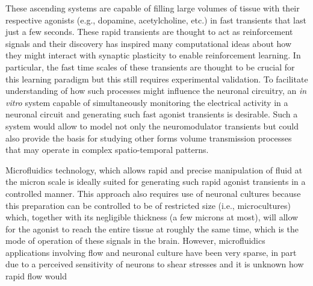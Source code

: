 These ascending systems are capable of filling large volumes of tissue with their respective agonists (e.g., dopamine, acetylcholine, etc.) in fast transients that last just a few seconds. These rapid transients are thought to act as reinforcement signals and their discovery has inspired many computational ideas about how they might interact with synaptic plasticity to enable reinforcement learning. In particular, the fast time scales of these transients are thought to be crucial for this learning paradigm but this still requires experimental validation. To facilitate understanding of how such processes might influence the neuronal circuitry, an \textit{in vitro} system capable of simultaneously monitoring the electrical activity in a neuronal circuit and generating such fast agonist transients is desirable. Such a system would allow to model not only the neuromodulator transients but could also provide the basis for studying other forms volume transmission processes that may operate in complex spatio-temporal patterns.

Microfluidics technology, which allows rapid and precise manipulation of fluid at the micron scale is ideally suited for generating such rapid agonist transients in a controlled manner. This approach also requires use of neuronal cultures because this preparation can be controlled to be of restricted size (i.e., microcultures) which, together with its negligible thickness (a few microns at most), will allow for the agonist to reach the entire tissue at roughly the same time, which is the mode of operation of these signals in the brain. However, microfluidics applications involving flow and neuronal culture have been very sparse, in part due to a perceived sensitivity of neurons to shear stresses and it is unknown how rapid flow would
